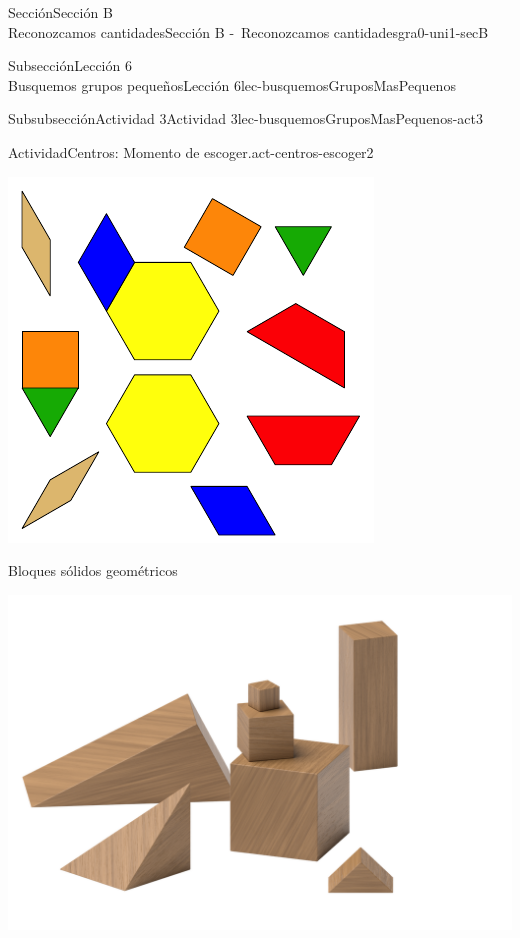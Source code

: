 \begin{sectionptx}{Sección}{{\Large Sección B\\}Reconozcamos cantidades}{}{Sección B -~Reconozcamos cantidades}{}{}{gra0-uni1-secB}
\begin{subsectionptx}{Subsección}{{\normalsize Lección 6\\[-0.05cm]}Busquemos grupos pequeños}{}{Lección 6}{}{}{lec-busquemosGruposMasPequenos}
\begin{subsubsectionptx}{Subsubsección}{Actividad 3}{}{Actividad 3}{}{}{lec-busquemosGruposMasPequenos-act3}
\begin{activity}{Actividad}{Centros: Momento de escoger.}{act-centros-escoger2}
\begin{sidebyside}{2}{0.025}{0.025}{0.05}
\begin{sbspanel}{0.45}
\includegraphics[max width=\linewidth, center]{external/svg-source/tikz-file-147344.pdf}
\end{sbspanel}%
\end{sidebyside}%
\begin{sidebyside}{2}{0.025}{0.025}{0.05}%
\begin{sbspanel}{0.45}%
Bloques sólidos geométricos%
\par
\includegraphics[max width=\linewidth, center]{external/png-source/K.1.A Beta Student Workbook.Geoblocks.png}
\end{sbspanel}%

\end{sidebyside}
\end{activity}
\end{subsubsectionptx}
\end{subsectionptx}
\end{sectionptx}
